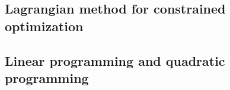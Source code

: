 \subsection{Lagrangian method for constrained optimization}
\subsection{Linear programming and quadratic programming}